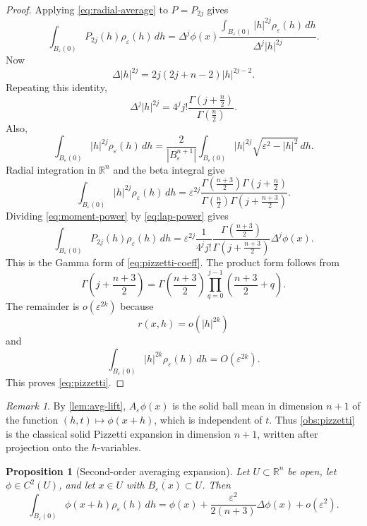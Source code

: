 \documentclass[12pt,reqno]{amsart}
\numberwithin{equation}{section}
\theoremstyle{plain}
\newtheorem{proposition}[proposition]{Proposition}
\theoremstyle{definition}
\theoremstyle{remark}
\newtheorem{remark}[remark]{Remark}
\newcommand{\R}{\mathbb{R}}
\newcommand{\rhoeps}{\rho_\varepsilon}
\begin{document}
\begin{proof}
Applying \eqref{eq:radial-average} to $P=P_{2j}$ gives
\[
  \int_{B_\varepsilon(0)}P_{2j}(h)\rhoeps(h)\,dh
  =
  \Delta^j\phi(x)
  \frac{
    \displaystyle
    \int_{B_\varepsilon(0)}|h|^{2j}\rhoeps(h)\,dh
  }{
    \displaystyle
    \Delta^j|h|^{2j}
  }.
\]
Now
\[
  \Delta |h|^{2j}
  =
  2j(2j+n-2)|h|^{2j-2}.
\]
Repeating this identity,
\begin{equation}\label{eq:lap-power}
  \Delta^j|h|^{2j}
  =
  4^j j!
  \frac{\Gamma\!\left(j+\frac n2\right)}
       {\Gamma\!\left(\frac n2\right)}.
\end{equation}
Also,
\[
  \int_{B_\varepsilon(0)}|h|^{2j}\rhoeps(h)\,dh
  =
  \frac{2}{|B_\varepsilon^{n+1}|}
  \int_{B_\varepsilon(0)}
  |h|^{2j}\sqrt{\varepsilon^2-|h|^2}\,dh.
\]
Radial integration in $\R^n$ and the beta integral give
\begin{equation}\label{eq:moment-power}
  \int_{B_\varepsilon(0)}|h|^{2j}\rhoeps(h)\,dh
  =
  \varepsilon^{2j}
  \frac{
    \Gamma\!\left(\frac{n+3}{2}\right)
    \Gamma\!\left(j+\frac n2\right)
  }{
    \Gamma\!\left(\frac n2\right)
    \Gamma\!\left(j+\frac{n+3}{2}\right)
  }.
\end{equation}
Dividing \eqref{eq:moment-power} by \eqref{eq:lap-power} gives
\[
  \int_{B_\varepsilon(0)}P_{2j}(h)\rhoeps(h)\,dh
  =
  \varepsilon^{2j}
  \frac{1}{4^j j!}
  \frac{\Gamma\!\left(\frac{n+3}{2}\right)}
       {\Gamma\!\left(j+\frac{n+3}{2}\right)}
  \Delta^j\phi(x).
\]
This is the Gamma form of \eqref{eq:pizzetti-coeff}. The product form
follows from
\[
  \Gamma\!\left(j+\frac{n+3}{2}\right)
  =
  \Gamma\!\left(\frac{n+3}{2}\right)
  \prod_{q=0}^{j-1}
  \left(\frac{n+3}{2}+q\right).
\]
The remainder is $o(\varepsilon^{2k})$ because
\[
  r(x,h)=o(|h|^{2k})
\]
and
\[
  \int_{B_\varepsilon(0)}|h|^{2k}\rhoeps(h)\,dh
  =
  O(\varepsilon^{2k}).
\]
This proves \eqref{eq:pizzetti}.
\end{proof}

\begin{remark}
By \cref{lem:avg-lift}, $A_\varepsilon\phi(x)$ is the solid ball mean in
dimension $n+1$ of the function $(h,t)\mapsto\phi(x+h)$, which is
independent of $t$. Thus \cref{obs:pizzetti} is the classical solid
Pizzetti expansion in dimension $n+1$, written after projection onto the
$h$-variables.
\end{remark}

\begin{proposition}[Second-order averaging expansion]
\label{prop:p2}
Let $U\subset\R^n$ be open, let $\phi\in C^2(U)$, and let
$x\in U$ with $\overline{B_\varepsilon(x)}\subset U$. Then
\begin{equation}\label{eq:p2-expand}
  \int_{B_\varepsilon(0)}
  \phi(x+h)\rhoeps(h)\,dh
  =
  \phi(x)
  +
  \frac{\varepsilon^2}{2(n+3)}
  \Delta\phi(x)
  +
  o(\varepsilon^2).
\end{equation}
\end{proposition}
\end{document}
